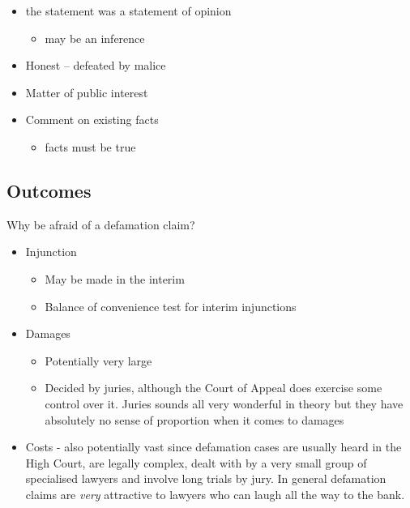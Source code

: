 \documentclass[]{article}
\begin{document}
\begin{itemize}
\item the statement was a statement of opinion 

  \begin{itemize}
  \item
    may be an inference
  \end{itemize}
\item   Honest -- defeated by malice
\item   Matter of public interest
\item  Comment on existing facts
  \begin{itemize}
  \item
    facts must be true
  \end{itemize}
\end{itemize}

\subsection{Outcomes}

Why be afraid of a defamation claim?

\begin{itemize}
\item
  Injunction

  \begin{itemize}
  \item
    May be made in the interim
  \item
    Balance of convenience test for interim injunctions
  \end{itemize}
\item
  Damages

  \begin{itemize}
  \item
    Potentially very large
  \item
    Decided by juries, although the Court of Appeal does exercise some
    control over it. Juries sounds all very wonderful in theory but they
    have absolutely no sense of proportion when it comes to damages
  \end{itemize}
\item
  {{Costs - also potentially vast since defamation cases are usually
  heard in the High Court, are legally complex, dealt with by a very
  small group of specialised lawyers and involve long trials by jury. In
  general defamation claims are }}\emph{{very }}{{attractive to lawyers
  who can laugh all the way to the bank.}}
\end{itemize}
\end{document}
